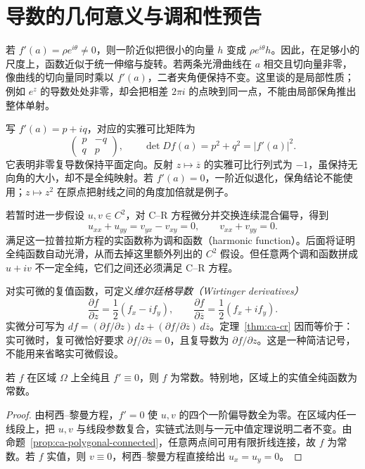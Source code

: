 \section{导数的几何意义与调和性预告}

若 $f'(a)=\rho e^{i\theta}\ne0$，则一阶近似把很小的向量 $h$ 变成 $\rho e^{i\theta}h$。因此，在足够小的尺度上，函数近似于统一伸缩与旋转。若两条光滑曲线在 $a$ 相交且切向量非零，像曲线的切向量同时乘以 $f'(a)$，二者夹角便保持不变。这里谈的是局部性质；例如 $e^z$ 的导数处处非零，却会把相差 $2\pi i$ 的点映到同一点，不能由局部保角推出整体单射。

写 $f'(a)=p+iq$，对应的实雅可比矩阵为
\[
 \begin{pmatrix}p&-q\\q&p\end{pmatrix},\qquad
 \det Df(a)=p^2+q^2=|f'(a)|^2.
\]
它表明非零复导数保持平面定向。反射 $z\mapsto\overline z$ 的实雅可比行列式为 $-1$，虽保持无向角的大小，却不是全纯映射。若 $f'(a)=0$，一阶近似退化，保角结论不能使用；$z\mapsto z^2$ 在原点把射线之间的角度加倍就是例子。

若暂时进一步假设 $u,v\in C^2$，对 C--R 方程微分并交换连续混合偏导，得到
\[
 u_{xx}+u_{yy}=v_{yx}-v_{xy}=0,\qquad
 v_{xx}+v_{yy}=0.
\]
满足这一拉普拉斯方程的实函数称为调和函数（harmonic function）。后面将证明全纯函数自动光滑，从而去掉这里额外列出的 $C^2$ 假设。但任意两个调和函数拼成 $u+iv$ 不一定全纯，它们之间还必须满足 C--R 方程。

对实可微的复值函数，可定义\emph{维尔廷格导数（Wirtinger derivatives）}
\[
 \frac{\partial f}{\partial z}=\frac12(f_x-if_y),\qquad
 \frac{\partial f}{\partial\overline z}=\frac12(f_x+if_y).
\]
实微分可写为 $df=(\partial f/\partial z)\,dz+(\partial f/\partial\overline z)\,d\overline z$。定理~\ref{thm:ca-cr} 因而等价于：实可微时，复可微恰好要求 $\partial f/\partial\overline z=0$，且复导数为 $\partial f/\partial z$。这是一种简洁记号，不能用来省略实可微假设。

\begin{proposition}
\label{prop:ca-zero-derivative}
若 $f$ 在区域 $\Omega$ 上全纯且 $f'\equiv0$，则 $f$ 为常数。特别地，区域上的实值全纯函数为常数。
\end{proposition}
\begin{proof}
由柯西--黎曼方程，$f'=0$ 使 $u,v$ 的四个一阶偏导数全为零。在区域内任一线段上，把 $u,v$ 与线段参数复合，实链式法则与一元中值定理说明二者不变。由命题~\ref{prop:ca-polygonal-connected}，任意两点间可用有限折线连接，故 $f$ 为常数。若 $f$ 实值，则 $v\equiv0$，柯西--黎曼方程直接给出 $u_x=u_y=0$。
\end{proof}

